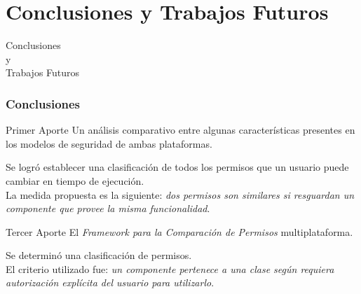 \section{Conclusiones y Trabajos Futuros}
\begin{frame}
 \begin{center}
  \LARGE Conclusiones\\ y\\ Trabajos Futuros
 \end{center}
\end{frame}
\begin{frame}
 \frametitle{Conclusiones}
 \begin{footnotesize}
 \begin{exampleblock}{Primer Aporte}
Un análisis comparativo entre algunas características presentes en los modelos de seguridad de ambas plataformas.
 \end{exampleblock}\pause
 \begin{exampleblock}{}
Se logró establecer una clasificación de todos los permisos que un usuario puede cambiar en tiempo de ejecución.\\ \pause La medida propuesta es la siguiente: \emph{dos permisos son similares si resguardan un componente que provee la misma funcionalidad}.\\ 
 \end{exampleblock}
 \begin{exampleblock}{Tercer Aporte}
El \emph{Framework para la Comparación de Permisos} multiplataforma.
 \end{exampleblock} \pause
 \begin{exampleblock}{}
Se determinó una clasificación de permisos.\\ \pause El criterio utilizado fue: \emph{un componente pertenece a una clase según requiera autorización explícita del usuario para utilizarlo}.
 \end{exampleblock}
 \end{footnotesize}
\end{frame}
